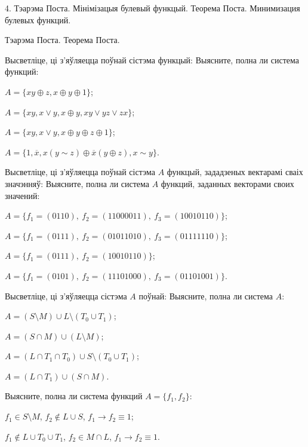 \documentclass[12pt, a4paper]{article}
\begin{document}
\biLangHeader
{4. Тэарэма Поста. Мінімізацыя булевый функцый.}
{Теорема Поста. Минимизация булевых функций.}

\biLangHeader
{Тэарэма Поста.}
{Теорема Поста.}

\begin{problemList}
    
\problemItemWithCommonPart
{Высветліце, ці з'яўляецца поўнай сістэма функцый:}
{Выясните, полна ли система функций:}
{%
\begin{belarusianEnumerateTwocol}
    \item $A=\{xy\oplus z, x\oplus y\oplus 1\}$;
    \item $A=\{xy, x\vee y, x\oplus y, xy\vee yz\vee zx\}$;
    \item $A=\{xy, x\vee y, x\oplus y\oplus z\oplus 1\}$;
    \item $A=\{1, \overline {x}, x(y\sim z)\oplus\overline{x}(y\oplus z), x\sim y\}$.
\end{belarusianEnumerateTwocol}
}

\smallskip

\problemItemWithCommonPart
{Высветліце, ці з'яўляецца поўнай сістэма $A$ функцый, зададзеных вектарамі сваіх значэнняў:}
{Выясните, полна ли система $A$ функций, заданных векторами своих значений:}
{%
\begin{belarusianEnumerate}
    \item $A=\{f_1=(0110),\ f_2=(11000011),\ f_3=(10010110)\}$;
    \item $A=\{f_1=(0111),\ f_2=(01011010),\ f_3=(01111110)\}$;
    \item $A=\{f_1=(0111),\ f_2=(10010110)\}$;
    \item $A=\{f_1=(0101),\ f_2=(11101000),\ f_3=(01101001)\}$.
\end{belarusianEnumerate}
}

\smallskip

\problemItemWithCommonPart
{Высветліце, ці з'яўляецца сістэма $A$ поўнай:}
{Выясните, полна ли система $A$:}
{%
\begin{belarusianEnumerateTwocol}
    \item $A=(S\setminus M)\cup L\setminus(T_0\cup T_1)$;
    \item $A=(S\cap M)\cup(L\setminus M)$;
    \item $A=(L\cap T_1\cap T_0)\cup S\setminus(T_0\cup T_1)$;
    \item $A=(L\cap T_1)\cup(S\cap M)$.
\end{belarusianEnumerateTwocol}
}

\smallskip

{Выясните, полна ли система функций $A=\{f_1, f_2\}$:}
{%
\begin{belarusianEnumerate}
    \item $f_1\in S\setminus M$, $f_2\not\in L\cup S$, $f_1 \rightarrow f_2 \equiv 1$;
    \item $f_1\not\in L \cup T_0 \cup T_1$, $f_2\in M\cap L$, $f_1 \rightarrow f_2 \equiv 1$.
\end{belarusianEnumerate}
}

\end{problemList}
\end{document}
